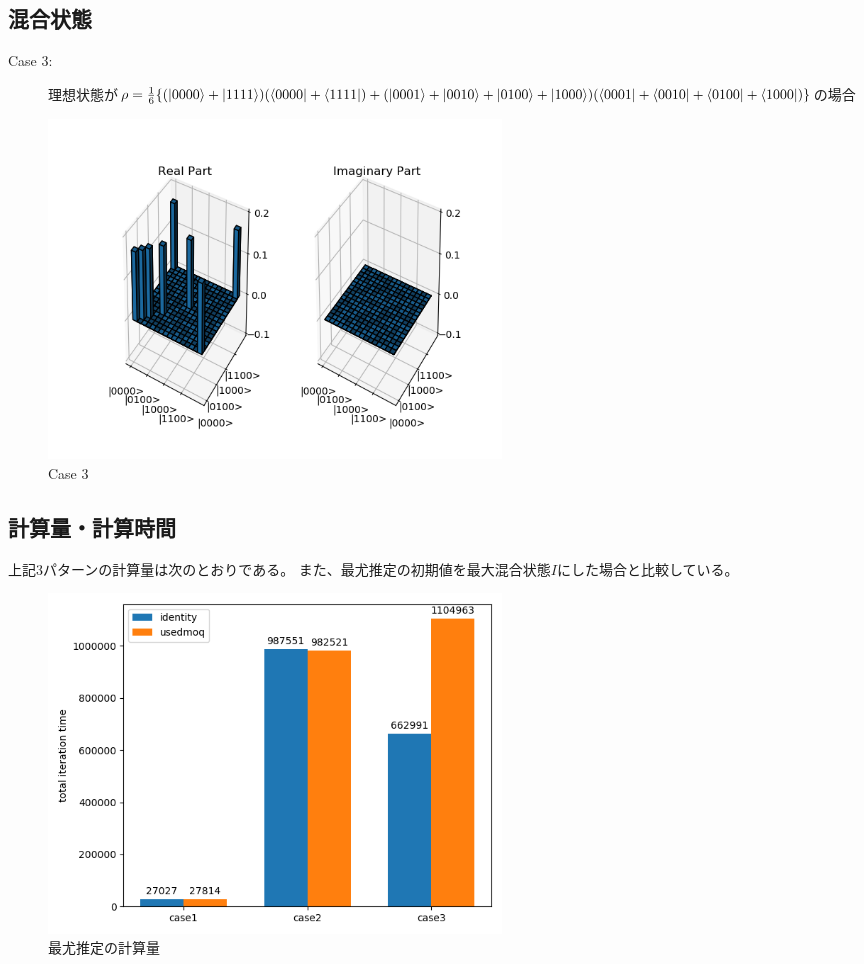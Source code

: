 \documentclass[11pt,a4j,notitlepage]{jreport}
\begin{document}
	\newpage
	\subsection*{混合状態}

	\begin{description}
		\item[Case 3:] 理想状態が$\rho = \frac{1}{6} \{ (\ket{0000} + \ket{1111}) (\bra{0000} + \bra{1111}) + (\ket{0001} + \ket{0010} + \ket{0100} + \ket{1000}) (\bra{0001} + \bra{0010} + \bra{0100} + \bra{1000})\}$の場合 
	\end{description}
	
	\begin{figure}[htbp]
		\centering
			\includegraphics[clip,width=12.0cm]{./picture/mixed.png}
			\caption{Case 3}
	\end{figure}

	\newpage

	\subsection*{計算量・計算時間}

	上記3パターンの計算量は次のとおりである。
	また、最尤推定の初期値を最大混合状態$I$にした場合と比較している。

	\begin{figure}[htbp]
		\centering
			\includegraphics[clip,width=12.0cm]{./picture/cg.png}
			\caption{最尤推定の計算量}
	\end{figure}
\end{document}
